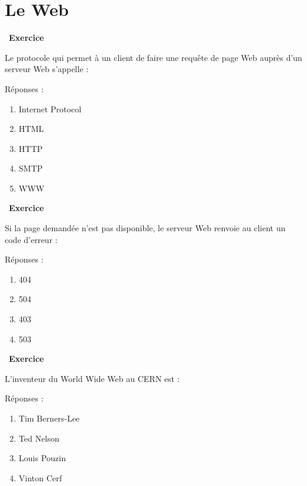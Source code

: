 \documentclass[
  11pt,
]{article}
\providecommand{\tightlist}{%
  \setlength{\itemsep}{0pt}\setlength{\parskip}{0pt}}
\newcounter{exo}
\newenvironment{exercice}[1]
{\par \medskip   \addtocounter{exo}{1} \noindent  
\begin{bclogo}[arrondi =0.1,   noborder = true, logo=\bccrayon, marge=4]{~\textbf{Exercice} \textbf{\theexo} {\itshape #1} }  \par}
{
\end{bclogo}
 \par \bigskip }
\newcounter{def}
\begin{document}
\hypertarget{le-web}{%
\section{Le Web}\label{le-web}}

\begin{exercice}{}

Le protocole qui permet à un client de faire une requête de page Web
auprès d'un serveur Web s'appelle :

Réponses :

\begin{enumerate}
\def\labelenumi{\arabic{enumi}.}
\tightlist
\item
  Internet Protocol
\item
  HTML
\item
  HTTP
\item
  SMTP
\item
  WWW
\end{enumerate}

\end{exercice}

\begin{exercice}{}

Si la page demandée n'est pas disponible, le serveur Web renvoie au
client un code d'erreur :

Réponses :

\begin{enumerate}
\def\labelenumi{\arabic{enumi}.}
\item
  404
\item
  504
\item
  403
\item
  503
\end{enumerate}

\end{exercice}

\begin{exercice}{}

L'inventeur du World Wide Web au CERN est :

Réponses :

\begin{enumerate}
\def\labelenumi{\arabic{enumi}.}
\item
  Tim Berners-Lee
\item
  Ted Nelson
\item
  Louis Pouzin
\item
  Vinton Cerf
\end{enumerate}

\end{exercice}
\end{document}
